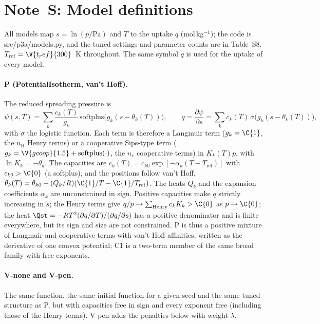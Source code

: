 \documentclass[11pt]{article}
\begin{document}
\section*{Note~S: Model definitions}

All models map $s = \ln(p/\mathrm{Pa})$ and $T$ to the uptake $q$ (mol\,kg$^{-1}$); the code is
src/p3a/models.py, and the tuned settings and parameter counts are in Table~S8. $T_{\mathrm{ref}} =
\V{t_ref}{300}$~K throughout. The same symbol $q$ is used for the uptake of every model.

\paragraph{P (PotentialIsotherm, van't Hoff).} The reduced spreading pressure is
\begin{equation*}
\psi(s,T) = \sum_{k} \frac{c_k(T)}{g_k}\,\mathrm{softplus}\bigl(g_k(s-\theta_k(T))\bigr),\qquad
q = \frac{\partial\psi}{\partial s} = \sum_k c_k(T)\,\sigma\bigl(g_k(s-\theta_k(T))\bigr),
\end{equation*}
with $\sigma$ the logistic function. Each term is therefore a Langmuir term ($g_k = \C{1}$, the
$n_{\mathrm{H}}$ Henry terms) or a cooperative Sips-type term ($g_k = \V{gcoop}{1.5} + \mathrm{softplus}(\cdot)$,
the $n_{\mathrm{c}}$ cooperative terms) in $K_k(T)p$, with $\ln K_k = -\theta_k$. The capacities are
$c_k(T) = c_{k0}\exp[-\alpha_k(T-T_{\mathrm{ref}})]$ with $c_{k0} > \C{0}$ (a softplus), and the positions follow
van't Hoff, $\theta_k(T) = \theta_{k0} - (Q_k/R)(\C{1}/T - \C{1}/T_{\mathrm{ref}})$. The heats $Q_k$ and the
expansion coefficients $\alpha_k$ are unconstrained in sign. Positive capacities make $q$ strictly increasing in
$s$; the Henry terms give $q/p \to \sum_{\mathrm{Henry}} c_k K_k > \C{0}$ as $p \to \C{0}$; the heat
$\Qst = -RT^{2}(\partial q/\partial T)/(\partial q/\partial s)$ has a positive denominator and is finite everywhere,
but its sign and size are not constrained. P is thus a positive mixture of Langmuir and cooperative terms with
van't Hoff affinities, written as the derivative of one convex potential; C1 is a two-term member of the same broad
family with free exponents.

\paragraph{V-none and V-pen.} The same function, the same initial function for a given seed and the same tuned
structure as P, but with capacities free in sign and every exponent free (including those of the Henry terms). V-pen adds
the penalties below with weight $\lambda$.
\end{document}
